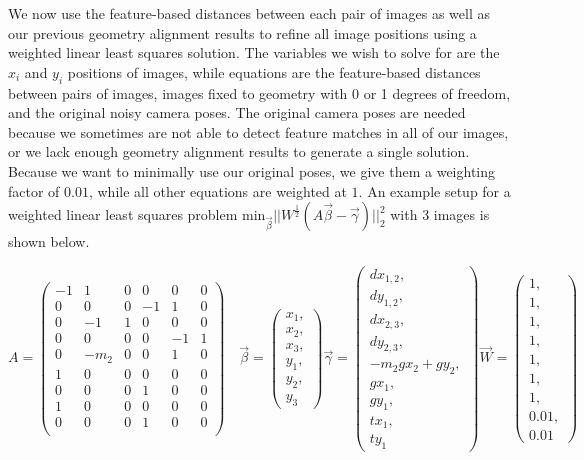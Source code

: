 \documentclass[]{spie}  %
\begin{document}
We now use the feature-based distances between each pair of images as
well as our previous geometry alignment results to refine all image
positions using a weighted linear least squares solution. The
variables we wish to solve for are the $x_i$ and $y_i$ positions of
images, while equations are the feature-based distances between pairs
of images, images fixed to geometry with 0 or 1 degrees of freedom,
and the original noisy camera poses. The original camera poses are
needed because we sometimes are not able to detect feature matches in
all of our images, or we lack enough geometry alignment results to
generate a single solution. Because we want to minimally use our
original poses, we give them a weighting factor of $0.01$, while all
other equations are weighted at $1$. An example setup for a weighted
linear least squares problem $\textrm{min}_{\vec{\beta}}
||W^\frac{1}{2}(A \vec{\beta} - \vec{\gamma})||_2^2 $ with 3 images is
shown below.


\[
A =
\begin{pmatrix}
  -1 & 1 & 0 & 0 & 0 & 0\\
  0 & 0 & 0 & -1 & 1 & 0\\
  0 & -1 & 1 & 0 & 0 & 0\\
  0 & 0 & 0 & 0 & -1 & 1\\
  0 & -m_2 & 0 & 0 & 1 & 0\\
  1 & 0 & 0 & 0 & 0 & 0\\
  0 & 0 & 0 & 1 & 0 & 0\\
  1 & 0 & 0 & 0 & 0 & 0\\
  0 & 0 & 0 & 1 & 0 & 0\\

\end{pmatrix}\quad
\vec{\beta} =
\begin{pmatrix}
  x_1, \\ x_2, \\ x_3, \\ y_1, \\ y_2, \\ y_3
\end{pmatrix}
\vec{\gamma} =
\begin{pmatrix}
  dx_{1,2}, \\ dy_{1,2}, \\ dx_{2,3}, \\ dy_{2,3}, \\ -m_2gx_2 + gy_2,
  \\ gx_1, \\ gy_1, \\ tx_1, \\ ty_1
  
\end{pmatrix}
\vec{W} =
\begin{pmatrix}
  1, \\ 1, \\ 1, \\ 1, \\ 1, \\ 1, \\ 1, \\ 0.01, \\ 0.01
\end{pmatrix}
\]
\end{document}
